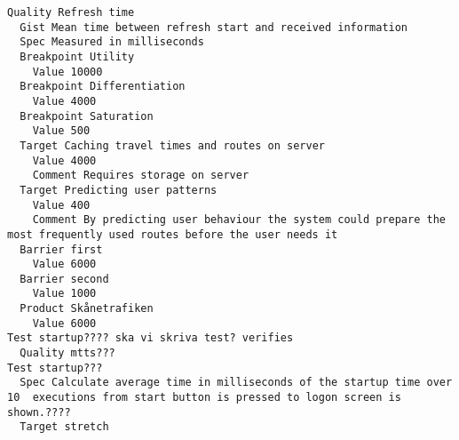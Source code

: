

\begin{lstlisting}
Quality Refresh time
  Gist Mean time between refresh start and received information
  Spec Measured in milliseconds
  Breakpoint Utility
    Value 10000
  Breakpoint Differentiation
    Value 4000
  Breakpoint Saturation
    Value 500
  Target Caching travel times and routes on server
    Value 4000
    Comment Requires storage on server
  Target Predicting user patterns
    Value 400
    Comment By predicting user behaviour the system could prepare the most frequently used routes before the user needs it
  Barrier first
    Value 6000
  Barrier second
    Value 1000
  Product Skånetrafiken
    Value 6000
Test startup???? ska vi skriva test? verifies
  Quality mtts???
Test startup???
  Spec Calculate average time in milliseconds of the startup time over 10  executions from start button is pressed to logon screen is shown.????
  Target stretch

\end{lstlisting}